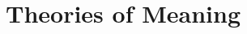 \documentclass[12pt]{report}
\begin{document}
\tableofcontents





\chapter{Theories of Meaning}
\label{chp:theories_of_meaning}








\end{document}
